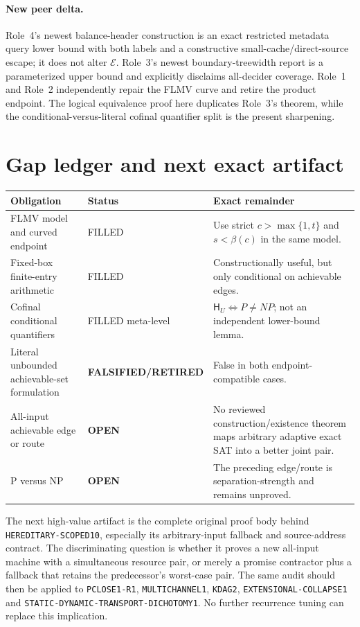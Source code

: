 \documentclass[11pt]{article}
\newcommand{\EE}{\mathcal E}
\newcommand{\OPEN}{\textbf{OPEN}}
\newcommand{\RET}{\textbf{FALSIFIED/RETIRED}}
\begin{document}
\paragraph{New peer delta.}
Role~4's newest balance-header construction is an exact restricted metadata
query lower bound with both labels and a constructive small-cache/direct-source
escape; it does not alter $\EE$.  Role~3's newest boundary-treewidth report is
a parameterized upper bound and explicitly disclaims all-decider coverage.
Role~1 and Role~2 independently repair the FLMV curve and retire the product
endpoint.  The logical equivalence proof here duplicates Role~3's theorem,
while the conditional-versus-literal cofinal quantifier split is the present
sharpening.

\section{Gap ledger and next exact artifact}

\begin{center}\small
\begin{tabular}{p{.29\linewidth}p{.18\linewidth}p{.43\linewidth}}
\toprule
Obligation & Status & Exact remainder\\\midrule
FLMV model and curved endpoint & FILLED & Use strict $c>\max\{1,t\}$ and $s<\beta(c)$ in the same model.\\
Fixed-box finite-entry arithmetic & FILLED & Constructionally useful, but only conditional on achievable edges.\\
Cofinal conditional quantifiers & FILLED meta-level & $\mathsf H_U\iff P\ne NP$; not an independent lower-bound lemma.\\
Literal unbounded achievable-set formulation & \RET & False in both endpoint-compatible cases.\\
All-input achievable edge or route & \OPEN & No reviewed construction/existence theorem maps arbitrary adaptive exact SAT into a better joint pair.\\
P versus NP & \OPEN & The preceding edge/route is separation-strength and remains unproved.\\
\bottomrule
\end{tabular}
\end{center}

The next high-value artifact is the complete original proof body behind
\texttt{HEREDITARY-SCOPED10}, especially its arbitrary-input fallback and
source-address contract.  The discriminating question is whether it proves a
new all-input machine with a simultaneous resource pair, or merely a promise
contractor plus a fallback that retains the predecessor's worst-case pair.
The same audit should then be applied to \texttt{PCLOSE1-R1},
\texttt{MULTICHANNEL1}, \texttt{KDAG2}, \texttt{EXTENSIONAL-COLLAPSE1} and
\texttt{STATIC-DYNAMIC-TRANSPORT-DICHOTOMY1}.  No further recurrence tuning
can replace this implication.
\end{document}
